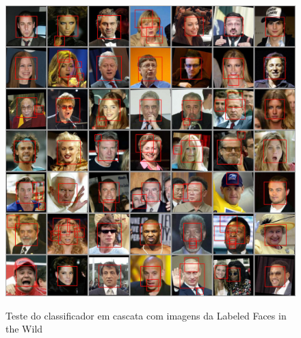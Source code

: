 \begin{figure}[htbp]
    \caption{Teste do classificador em cascata com imagens da Labeled Faces in the Wild}
    \label{fig:detector_facial_lfw}
    \begin{center}
        {\includegraphics[width=0.99\linewidth]{imagens/detector_facial_lfw.jpg}}
    \end{center}
\end{figure}